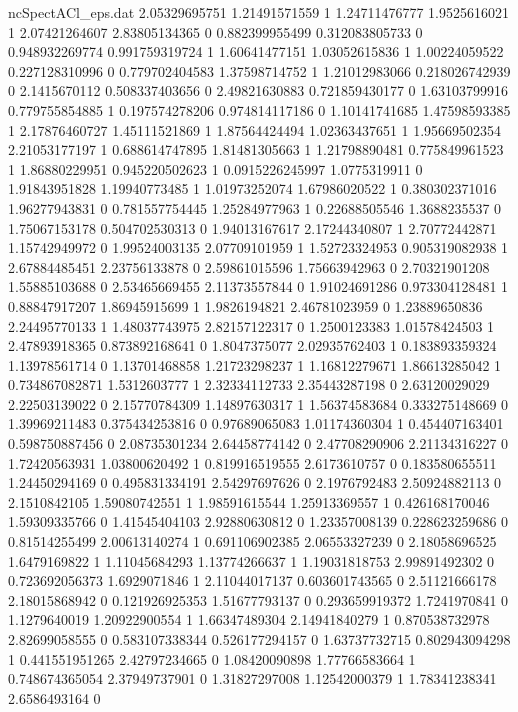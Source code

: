 \begin{filecontents}{ncSpectACl_eps.dat}
2.05329695751 1.21491571559 1
1.24711476777 1.9525616021 1
2.07421264607 2.83805134365 0
0.882399955499 0.312083805733 0
0.948932269774 0.991759319724 1
1.60641477151 1.03052615836 1
1.00224059522 0.227128310996 0
0.779702404583 1.37598714752 1
1.21012983066 0.218026742939 0
2.1415670112 0.508337403656 0
2.49821630883 0.721859430177 0
1.63103799916 0.779755854885 1
0.197574278206 0.974814117186 0
1.10141741685 1.47598593385 1
2.17876460727 1.45111521869 1
1.87564424494 1.02363437651 1
1.95669502354 2.21053177197 1
0.688614747895 1.81481305663 1
1.21798890481 0.775849961523 1
1.86880229951 0.945220502623 1
0.0915226245997 1.0775319911 0
1.91843951828 1.19940773485 1
1.01973252074 1.67986020522 1
0.380302371016 1.96277943831 0
0.781557754445 1.25284977963 1
0.22688505546 1.3688235537 0
1.75067153178 0.504702530313 0
1.94013167617 2.17244340807 1
2.70772442871 1.15742949972 0
1.99524003135 2.07709101959 1
1.52723324953 0.905319082938 1
2.67884485451 2.23756133878 0
2.59861015596 1.75663942963 0
2.70321901208 1.55885103688 0
2.53465669455 2.11373557844 0
1.91024691286 0.973304128481 1
0.88847917207 1.86945915699 1
1.9826194821 2.46781023959 0
1.23889650836 2.24495770133 1
1.48037743975 2.82157122317 0
1.2500123383 1.01578424503 1
2.47893918365 0.873892168641 0
1.8047375077 2.02935762403 1
0.183893359324 1.13978561714 0
1.13701468858 1.21723298237 1
1.16812279671 1.86613285042 1
0.734867082871 1.5312603777 1
2.32334112733 2.35443287198 0
2.63120029029 2.22503139022 0
2.15770784309 1.14897630317 1
1.56374583684 0.333275148669 0
1.39969211483 0.375434253816 0
0.97689065083 1.01174360304 1
0.454407163401 0.598750887456 0
2.08735301234 2.64458774142 0
2.47708290906 2.21134316227 0
1.72420563931 1.03800620492 1
0.819916519555 2.6173610757 0
0.183580655511 1.24450294169 0
0.495831334191 2.54297697626 0
2.1976792483 2.50924882113 0
2.1510842105 1.59080742551 1
1.98591615544 1.25913369557 1
0.426168170046 1.59309335766 0
1.41545404103 2.92880630812 0
1.23357008139 0.228623259686 0
0.81514255499 2.00613140274 1
0.691106902385 2.06553327239 0
2.18058696525 1.6479169822 1
1.11045684293 1.13774266637 1
1.19031818753 2.99891492302 0
0.723692056373 1.6929071846 1
2.11044017137 0.603601743565 0
2.51121666178 2.18015868942 0
0.121926925353 1.51677793137 0
0.293659919372 1.7241970841 0
1.1279640019 1.20922900554 1
1.66347489304 2.14941840279 1
0.870538732978 2.82699058555 0
0.583107338344 0.526177294157 0
1.63737732715 0.802943094298 1
0.441551951265 2.42797234665 0
1.08420090898 1.77766583664 1
0.748674365054 2.37949737901 0
1.31827297008 1.12542000379 1
1.78341238341 2.6586493164 0

\end{filecontents}

